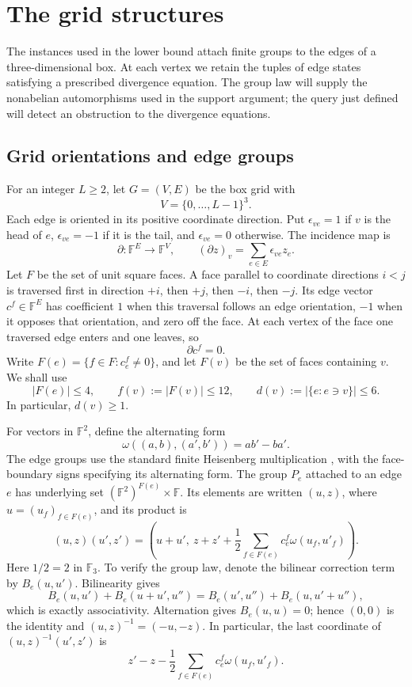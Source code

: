 \section{The grid structures}\label{sec:structures}

The instances used in the lower bound attach finite groups to the edges
of a three-dimensional box.  At each vertex we retain the tuples of edge
states satisfying a prescribed divergence equation.  The group law will
supply the nonabelian automorphisms used in the support argument; the
query just defined will detect an obstruction to the divergence equations.

\subsection{Grid orientations and edge groups}

For an integer $L\ge2$, let $G=(V,E)$ be the box grid with
\[
 V=\{0,\ldots,L-1\}^3.
\]
Each edge is oriented in its positive coordinate direction.  Put
$\epsilon_{ve}=1$ if $v$ is the head of $e$, $\epsilon_{ve}=-1$ if it is
the tail, and $\epsilon_{ve}=0$ otherwise.  The incidence map is
\[
 \partial:\mathbb F^E\longrightarrow\mathbb F^V,
 \qquad (\partial z)_v=\sum_{e\in E}\epsilon_{ve}z_e.
\]
Let $F$ be the set of unit square faces.  A face parallel to coordinate
directions $i<j$ is traversed first in direction $+i$, then $+j$, then
$-i$, then $-j$.  Its edge vector $c^f\in\mathbb F^E$ has coefficient
$1$ when this traversal follows an edge orientation, $-1$ when it opposes
that orientation, and zero off the face.  At each vertex of the face one
traversed edge enters and one leaves, so
\begin{equation}\label{eq:face-cycle}
 \partial c^f=0.
\end{equation}
Write $F(e)=\{f\in F:c^f_e\ne0\}$, and let $F(v)$ be the set of faces
containing $v$.  We shall use
\[
 |F(e)|\le4,\qquad f(v):=|F(v)|\le12,
 \qquad d(v):=|\{e:e\ni v\}|\le6.
\]
In particular, $d(v)\ge1$.

For vectors in $\mathbb F^2$, define the alternating form
\[
 \omega((a,b),(a',b'))=ab'-ba'.
\]
The edge groups use the standard finite Heisenberg multiplication
\cite[Section~2.1]{gurevichHadani2009}, with the face-boundary signs
specifying its alternating form.
The group $P_e$ attached to an edge $e$ has underlying set
$(\mathbb F^2)^{F(e)}\times\mathbb F$.  Its elements are written $(u,z)$,
where $u=(u_f)_{f\in F(e)}$, and its product is
\begin{equation}\label{eq:edge-product}
 (u,z)(u',z')=
 \left(u+u',\ z+z'+\frac12
          \sum_{f\in F(e)}c^f_e\omega(u_f,u'_f)\right).
\end{equation}
Here $1/2=2$ in $\mathbb F_3$.  To verify the group law, denote the
bilinear correction term by $B_e(u,u')$.  Bilinearity gives
\[
 B_e(u,u')+B_e(u+u',u'')
   =B_e(u',u'')+B_e(u,u'+u''),
\]
which is exactly associativity.  Alternation gives $B_e(u,u)=0$; hence
$(0,0)$ is the identity and $(u,z)^{-1}=(-u,-z)$.
In particular, the last coordinate of $(u,z)^{-1}(u',z')$ is
\begin{equation}\label{eq:edge-difference}
 z'-z-\frac12\sum_{f\in F(e)}c^f_e\omega(u_f,u'_f).
\end{equation}

